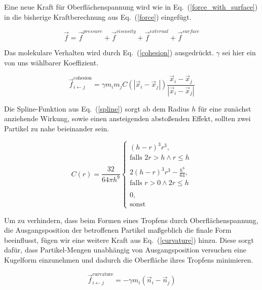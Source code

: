 \documentclass[a4paper]{paper}
\renewcommand{\eqref}[1]{Eq.~(\ref{#1})}
\begin{document}
Eine neue Kraft für Oberflächenspannung wird wie in \eqref{force_with_surface} in die bisherige Kraftberechnung aus \eqref{force} eingefügt.

\begin{equation}
\label{force_with_surface}
\vec{f} = \vec{f}^{pressure} + \vec{f}^{viscosity} + \vec{f}^{external} + \vec{f}^{surface}
\end{equation}


Das molekulare Verhalten wird durch \eqref{cohesion} ausgedrückt. $\gamma$ sei hier ein von uns wählbarer Koeffizient.

\begin{equation}
\label{cohesion}
\vec{f}_{i\leftarrow j}^{\text{cohesion}} = \gamma m_{i} m_{j} C(|\vec{x}_i - \vec{x}_j|)\frac{\vec{x}_i - \vec{x}_j}{|\vec{x}_i - \vec{x}_j|}
\end{equation}

Die Spline-Funktion aus \eqref{spline} sorgt ab dem Radius $h$ für eine zunächst anziehende Wirkung, sowie einen ansteigenden abstoßenden Effekt, sollten zwei Partikel zu nahe beieinander sein.

\begin{equation}
\label{spline}
C(r) = \frac{32}{64 \pi h^9}
\begin{cases}
(h-r)^3r^3,   \\ \text{falls }  2r > h \land r \leq h\\

\\ 
2(h-r)^3r^3 - \frac{h^6}{64}, \\ \text{falls } r > 0 \land 2r \leq h\\
\\
0, \\ \text{sonst}  
\end{cases}
\end{equation}




Um zu verhindern, dass beim Formen eines Tropfens durch Oberflächenspannung, die Ausgangsposition der betroffenen Partikel maßgeblich die finale Form beeinflusst, fügen wir eine weitere Kraft aus \eqref{curvature} hinzu.
Diese sorgt dafür, dass Partikel-Mengen unabhängig von Ausgangsposition versuchen eine Kugelform einzunehmen und dadurch die Oberfläche ihres Tropfens minimieren.

\begin{equation}
\label{curvature}
\vec{f}_{i\leftarrow j}^{\text{curvature}} = -\gamma m_{i}(\vec{n}_i - \vec{n}_j)
\end{equation}
\end{document}
